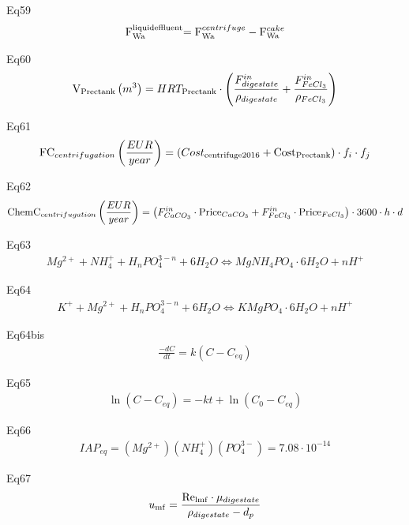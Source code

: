 \documentclass[10pt,a4paper]{article}
\begin{document}
Eq59
\begin{align}
	{\rm{F}}_{{\rm{Wa}}}^{{\rm{liquid effluent}}}{\rm{ = F}}_{{\rm{Wa}}}^{centrifuge} - {\rm{F}}_{{\rm{Wa}}}^{cake}
\end{align}

Eq60
\begin{align}
	 {{\rm{V}}_{{\rm{Prec tank}}}}\left( {{m^3}} \right) = HR{T_{{\rm{Prec tank}}}}\cdot\left( {\frac{{F_{digestate}^{in}}}{{{\rho _{digestate}}}} + \frac{{F_{FeC{l_3}}^{in}}}{{{\rho _{FeC{l_3}}}}}} \right)
\end{align}

Eq61
\begin{align}
	{\rm{F}}{{\rm{C}}_{centrifugation}}\left( {\frac{EUR }{{year}}} \right) = \left( {Cos{t_{{\rm{centrifuge 2016}}}} + {\rm{Cos}}{{\rm{t}}_{{\rm{Prec tank}}}}} \right) \cdot {f_i}\cdot{f_j}
\end{align}

Eq62
\begin{align}
	{\rm{Chem}}{{\rm{C}}_{centrifugation}}{\rm{ }}\left( {\frac{EUR }{{year}}} \right) = \left( {F_{CaC{O_3}}^{in} \cdot {\rm{Pric}}{{\rm{e}}_{CaC{O_3}}} + F_{FeC{l_3}}^{in} \cdot {\rm{Pric}}{{\rm{e}}_{FeC{l_3}}}} \right)\cdot3600\cdot h\cdot d
\end{align}

Eq63
\begin{align}
	M{g^{2 + }} + NH_4^ +  + {H_n}PO_4^{3 - n} + 6{H_2}O \Leftrightarrow MgN{H_4}P{O_4}\cdot6{H_2}O + n{H^ + }
\end{align}

Eq64
\begin{align}
	{K^ + } + M{g^{2 + }} + {H_n}PO_4^{3 - n} + 6{H_2}O \Leftrightarrow KMgP{O_4}\cdot6{H_2}O + n{H^ + }
\end{align}

Eq64bis
\begin{align}
	\frac{{ - dC}}{{dt}} = k\left( {C - {C_{eq}}} \right)
\end{align}

Eq65
\begin{align}
	\ln \left( {C - {C_{eq}}} \right) =  - kt + \ln \left( {{C_0} - {C_{eq}}} \right)
\end{align}

Eq66
\begin{align}
	IA{P_{eq}} = \left( {M{g^{2 + }}} \right)\left( {NH_4^ + } \right)\left( {PO_4^{3 - }} \right) = 7.08 \cdot {10^{ - 14}}
\end{align}

Eq67
\begin{align}
	{u_{{\rm{mf}}}} = \frac{{{{{\mathop{\rm Re}\nolimits} }_{{\rm{l mf}}}} \cdot {\mu _{digestate}}}}{{{\rho _{digestate}} - {d_p}}}
\end{align}
\end{document}
